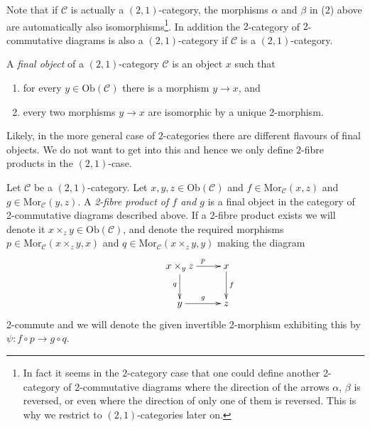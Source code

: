 Note that if $\mathcal{C}$ is actually a $(2,1)$-category,
the morphisms $\alpha$ and $\beta$ in (2) above are automatically
also isomorphisms\footnote{In fact it seems in the $2$-category case
that one could define another 2-category of 2-commutative diagrams where
the direction of the arrows $\alpha$, $\beta$ is reversed, or even
where the direction of only one of them is reversed. This is why
we restrict to $(2,1)$-categories later on.}.
In addition the $2$-category of
$2$-commutative diagrams is also a $(2,1)$-category if $\mathcal{C}$ is
a $(2, 1)$-category.

\begin{definition}
\label{definition-final-object-2-category}
A {\it final object} of a $(2, 1)$-category
$\mathcal{C}$ is an object $x$ such that
\begin{enumerate}
\item for every $y \in \text{Ob}(\mathcal{C})$ there is a morphism $y \to x$,
and
\item every two morphisms $y \to x$ are isomorphic by a unique 2-morphism.
\end{enumerate}
\end{definition}

\noindent
Likely, in the more general case of $2$-categories there are different
flavours of final objects. We do not want to get into this and hence
we only define $2$-fibre products in the $(2,1)$-case.

\begin{definition}
\label{definition-2-fibre-products}
Let $\mathcal{C}$ be a $(2, 1)$-category.
Let $x, y, z\in \text{Ob}(\mathcal{C})$ and
$f\in \text{Mor}_{\mathcal{C}}(x, z)$
and $g\in \text{Mor}_{\mathcal C}(y, z)$. A
{\it 2-fibre product of $f$ and $g$} is
a final object in the category of 2-commutative diagrams
described above. If a 2-fibre product exists we
will denote it $x\times_z y\in \text{Ob}(\mathcal{C})$, and denote the
required morphisms $p\in \text{Mor}_{\mathcal C}(x\times_z y, x)$ and
$q\in \text{Mor}_{\mathcal C}(x\times_z y, y)$ making the diagram
$$
\xymatrix{
&x\times_y z \ar[r]^{p} \ar[d]_{q} & x \ar[d]^{f} \\
&y \ar[r]^{g} & z }
$$
2-commute and we will denote the given invertible
2-morphism exhibiting this by $\psi : f \circ p \to g \circ q$.
\end{definition}

